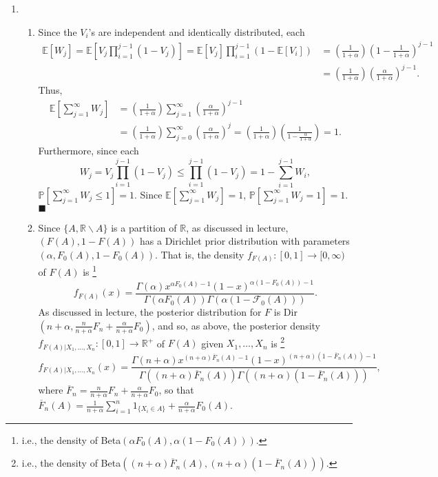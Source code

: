 \documentclass[11pt]{article}
\renewcommand{\qed}{\quad \ensuremath{\blacksquare}}
\newcommand{\sminus}{\backslash}
\newcommand{\E}{\mathbb{E}} %
\newcommand{\F}{\mathcal{F}}
\newcommand{\pr}{\mathbb{P}} %
\newcommand{\R}{\mathbb{R}} %
\newcommand{\ol}{\overline}
\begin{document}
\begin{enumerate}
\newpage
\item
\begin{enumerate}
\item Since the $V_i$'s are independent and identically distributed, each
\begin{align*}
\E[W_j]
    = \E\left[ V_j \prod_{i = 1}^{j - 1} (1 - V_j) \right]
    = \E[V_j] \prod_{i = 1}^{j - 1} (1 - \E[V_i])
 &  = \left( \frac{1}{1 + \alpha} \right)
                            \left( 1 - \frac{1}{1 + \alpha} \right)^{j - 1} \\
 &  = \left( \frac{1}{1 + \alpha} \right)
                            \left( \frac{\alpha}{1 + \alpha} \right)^{j - 1}.
\end{align*}
Thus,
\begin{align*}
\E\left[ \sum_{j = 1}^\infty W_j \right]
 &  = \left( \frac{1}{1 + \alpha} \right)
    \sum_{j = 1}^\infty \left( \frac{\alpha}{1 + \alpha} \right)^{j - 1}    \\
 &  = \left( \frac{1}{1 + \alpha} \right)
        \sum_{j = 0}^\infty \left( \frac{\alpha}{1 + \alpha} \right)^j
    = \left( \frac{1}{1 + \alpha} \right)
    \left( \frac{1}{1 - \frac{\alpha}{1 + \alpha}} \right)
    = 1.
\end{align*}
Furthermore, since each
\[W_j
    = V_j \prod_{i = 1}^{j - 1} (1 - V_j)
    \leq \prod_{i = 1}^{j - 1} (1 - V_j)
    = 1 - \sum_{i = 1}^{j - 1} W_i,
\]
$\pr\left[ \sum_{j = 1}^\infty W_j \leq 1 \right] = 1$. Since
$\E\left[ \sum_{j = 1}^\infty W_j \right] = 1$,
$\pr\left[ \sum_{j = 1}^\infty W_j = 1 \right] = 1$. \qed

\item Since $\{A,\R \sminus A\}$ is a partition of $\R$, as discussed in
lecture, $(F(A),1 - F(A))$ has a Dirichlet prior distribution with parameters
$(\alpha,F_0(A),1 - F_0(A))$. That is, the density
$f_{F(A)} : [0,1] \to [0,\infty)$ of $F(A)$ is
\footnote{i.e., the density of
Beta$(\alpha F_0(A), \alpha (1 - F_0(A)))$.}
\[f_{F(A)}(x)
            = \frac{\Gamma(\alpha)
                x^{\alpha F_0(A) - 1}
                \left( 1 - x \right)^{\alpha (1 - F_0(A)) - 1}}
            {\Gamma(\alpha F_0(A))\Gamma(\alpha(1 - \F_0(A)))}.\]
As discussed in lecture, the posterior distribution for $F$ is
Dir$(n + \alpha, \frac{n}{n + \alpha} F_n + \frac{\alpha}{n + \alpha} F_0)$,
and so, as above, the posterior density
$f_{F(A) | X_1,\dots,X_n} : [0,1] \to \R^+$ of $F(A)$ given $X_1,\dots,X_n$ is 
\footnote{i.e., the density of
Beta$((n + \alpha) \ol F_n(A), (n + \alpha) (1 - \ol F_n(A)))$.}
\begin{equation}
f_{F(A)|X_1,\dots,X_n}(x)
            = \frac{\Gamma(n + \alpha)
                x^{(n + \alpha) \ol F_n(A) - 1}
                \left( 1 - x \right)^{(n + \alpha)(1 - \ol F_n(A)) - 1}}
            {\Gamma((n + \alpha) \ol F_n(A))\Gamma((n + \alpha)(1 - \ol F_n(A)))},
\label{eq:post}
\end{equation}
where $\ol F_n = \frac{n}{n + \alpha} F_n + \frac{\alpha}{n + \alpha} F_0$, so
that
$\ol F_n(A) = \frac{1}{n + \alpha} \sum_{i = 1}^n 1_{\{X_i \in A\}} + \frac{\alpha}{n + \alpha} F_0(A)$.


\end{enumerate}
\end{enumerate}
\end{document}
